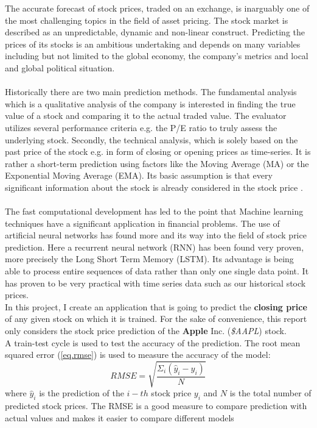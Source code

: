 \documentclass[fleqn,10pt]{SelfArx} %
\begin{document}
The accurate forecast of stock prices, traded on an exchange, is inarguably one of the most challenging topics in the field of asset pricing. The stock market is described as an unpredictable, dynamic and non-linear construct. Predicting the prices of its stocks is an ambitious undertaking and depends on many variables including but not limited to the global economy, the company's metrics and local and global political situation. 
\\
\\
Historically there are two main prediction methods. The fundamental analysis which is a qualitative analysis of the company is interested in finding the true value of a stock and comparing it to the actual traded value. The evaluator utilizes several performance criteria e.g. the P/E ratio to truly assess the underlying stock. Secondly, the technical analysis, which is solely based on the past price of the stock e.g. in form of closing or opening prices as time-series. It is rather a short-term prediction using factors like the Moving Average (MA) or the Exponential Moving Average (EMA). Its basic assumption is that every significant information about the stock is already considered in the stock price \cite{prediction}.
\\
\\
The fast computational development has led to the point that Machine learning techniques have a significant application in financial problems. The use of artificial neural networks has found more and its way into the field of stock price prediction. Here a recurrent neural network (RNN) has been found very proven, more precisely the Long Short Term Memory (LSTM). Its advantage is being
able to process entire sequences of data rather than only one single data point. It has proven to be very practical with time series data such as our historical stock prices. 
\\
In this project, I create an application that is going to predict the \textbf{closing price} of any given stock on which it is trained. For the sake of convenience, this report only considers the stock price prediction of the \textbf{Apple} Inc. (\textit{\$AAPL}) stock.
\\
A train-test cycle is used to test the accuracy of the prediction. The root mean squared error (\ref{eq.rmse}) is used to measure the accuracy of the model:
\begin{equation}
RMSE = \sqrt{\dfrac{\Sigma_{i}(\hat{y}_i-y_i)}{N}} 
\label{eq.rmse}
\end{equation}
where $\hat{y}_i$ is the prediction of the $i-th$ stock price $y_i$ and $N$ is the total number of predicted stock prices. The RMSE is a good measure to compare prediction with actual values and makes it easier to compare different models
\end{document}
